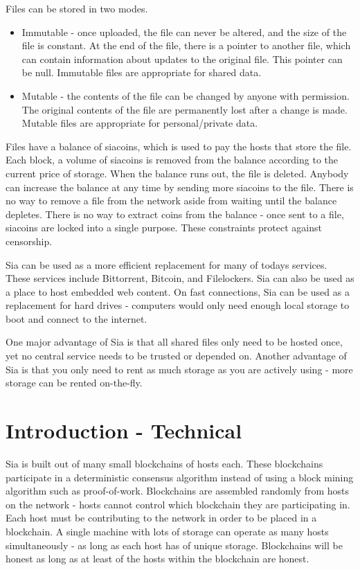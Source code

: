 \documentclass[twocolumn]{article}
\begin{document}
Files can be stored in two modes.
\begin{itemize}
	\item Immutable - once uploaded, the file can never be altered, and the size of the file is constant.
	At the end of the file, there is a pointer to another file, which can contain information about updates to the original file.
	This pointer can be null.
	Immutable files are appropriate for shared data.
	\item Mutable - the contents of the file can be changed by anyone with permission.
	The original contents of the file are permanently lost after a change is made.
	Mutable files are appropriate for personal/private data.
\end{itemize}

Files have a balance of siacoins, which is used to pay the hosts that store the file.
Each block, a volume of siacoins is removed from the balance according to the current price of storage.
When the balance runs out, the file is deleted.
Anybody can increase the balance at any time by sending more siacoins to the file.
There is no way to remove a file from the network aside from waiting until the balance depletes.
There is no way to extract coins from the balance - once sent to a file, siacoins are locked into a single purpose.
These constraints protect against censorship.

Sia can be used as a more efficient replacement for many of todays services.
These services include Bittorrent, Bitcoin, and Filelockers.
Sia can also be used as a place to host embedded web content.
On fast connections, Sia can be used as a replacement for hard drives - computers would only need enough local storage to boot and connect to the internet.

One major advantage of Sia is that all shared files only need to be hosted once, yet no central service needs to be trusted or depended on.
Another advantage of Sia is that you only need to rent as much storage as you are actively using - more storage can be rented on-the-fly.

\section{Introduction - Technical}

Sia is built out of many small blockchains of \numhosts \space hosts each.
These blockchains participate in a deterministic consensus algorithm instead of using a block mining algorithm such as proof-of-work.
Blockchains are assembled randomly from hosts on the network - hosts cannot control which blockchain they are participating in.
Each host must be contributing \storageperhost \space to the network in order to be placed in a blockchain.
A single machine with lots of storage can operate as many hosts simultaneously - as long as each host has \storageperhost \space of unique storage.
Blockchains will be honest as long as at least \fiftyone \space of the hosts within the blockchain are honest.
\end{document}
